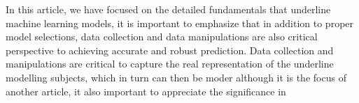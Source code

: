
\par
In this article, we have focused on the detailed fundamentals that underline machine learning models, it is important to emphasize that in addition to proper model selections, data collection and data manipulations are also critical perspective to achieving accurate and robust prediction. Data collection and manipulations are critical to capture the real representation of the underline modelling subjects, which in turn can then be moder although it is the focus of another article, it also important to appreciate the significance in 
\par 
